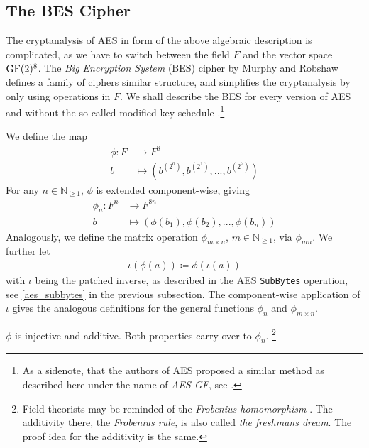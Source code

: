 \subsection{The BES Cipher } \label{the_bes_cipher}

The cryptanalysis of AES in form of the above algebraic description is complicated, as we have to switch between the field \(F\) and the vector space \(\operatorname{GF}(2)^8\). The \emph{Big Encryption System} (BES) cipher by Murphy and Robshaw \cite{Murphy2002} defines a family of ciphers similar structure, and simplifies the cryptanalysis by only using operations in \(F\). We shall describe the BES for every version of AES and without the so-called modified key schedule \cite[p. 3]{Murphy2002}.\footnote{As a sidenote, that the authors of AES proposed a similar method as described here under the name of \emph{AES-GF}, see \cite[pp. 192-194]{Daemen_2020}.}

\phantom{}

We define the map
\begin{align}
    \phi \colon F &\to F^8\\
    b &\mapsto \left(b^{\left(2^0\right)}, b^{\left(2^1\right)}, ..., b^{\left(2^7\right)}\right)
\end{align}
For any \(n \in \mathbb{N}_{\geq 1}\), \(\phi\) is extended component-wise, giving
\begin{align}
    \phi_n \colon F^n &\to F^{8n}\\
    b &\mapsto \left(\phi(b_1), \phi(b_2), ..., \phi(b_n)\right)
\end{align}
Analogously, we define the matrix operation \(\phi_{m \times n}\), \(m \in \mathbb{N}_{\geq 1}\), via \(\phi_{mn}\). We further let
\begin{align}
    \iota(\phi(a)) \coloneqq \phi(\iota(a))
\end{align}
with \(\iota\) being the patched inverse, as described in the AES \texttt{SubBytes} operation, see \ref{aes_subbytes} in the previous subsection. The component-wise application of \(\iota\) gives the analogous definitions for the general functions \(\phi_n\) and \(\phi_{m \times n}\).

\begin{theorem}
    \(\phi\) is injective and additive. Both properties carry over to \(\phi_n\). \footnote{Field theorists may be reminded of the \emph{Frobenius homomorphism} \cite[p. 337]{Fischer2017}. The additivity there, the \emph{Frobenius rule}, is also called \emph{the freshmans dream}. The proof idea for the additivity is the same.}
\end{theorem}

